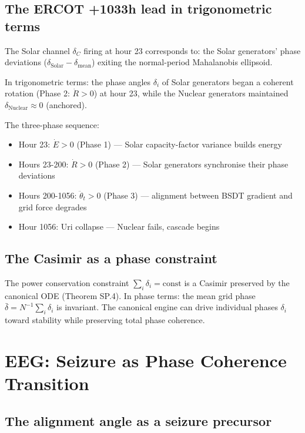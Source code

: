 \documentclass[11pt,a4paper,openany]{book}
\theoremstyle{definition}
\begin{document}
\section{The ERCOT +1033h lead in trigonometric terms}

The Solar channel $\delta_C$ firing at hour 23 corresponds to:
the Solar generators' phase deviations ($\delta_\mathrm{Solar} - \delta_\mathrm{mean}$) exiting
the normal-period Mahalanobis ellipsoid.

In trigonometric terms: the phase angles $\delta_i$ of Solar generators began a
coherent rotation (Phase 2: $\dot R > 0$) at hour 23, while the Nuclear generators
maintained $\delta_\mathrm{Nuclear} \approx 0$ (anchored).

The three-phase sequence:
\begin{itemize}
\item Hour 23: $\dot E > 0$ (Phase 1) — Solar capacity-factor variance builds energy
\item Hours 23-200: $\dot R > 0$ (Phase 2) — Solar generators synchronise their phase deviations
\item Hours 200-1056: $\ddot\theta_t > 0$ (Phase 3) — alignment between BSDT gradient and grid force degrades
\item Hour 1056: Uri collapse — Nuclear fails, cascade begins
\end{itemize}

\section{The Casimir as a phase constraint}

The power conservation constraint $\sum_i \delta_i = \mathrm{const}$ is a Casimir
preserved by the canonical ODE (Theorem SP.4). In phase terms: the mean grid phase
$\bar\delta = N^{-1}\sum_i\delta_i$ is invariant. The canonical engine can drive individual
phases $\delta_i$ toward stability while preserving total phase coherence.

\chapter{EEG: Seizure as Phase Coherence Transition}

\section{The alignment angle as a seizure precursor}
\end{document}
